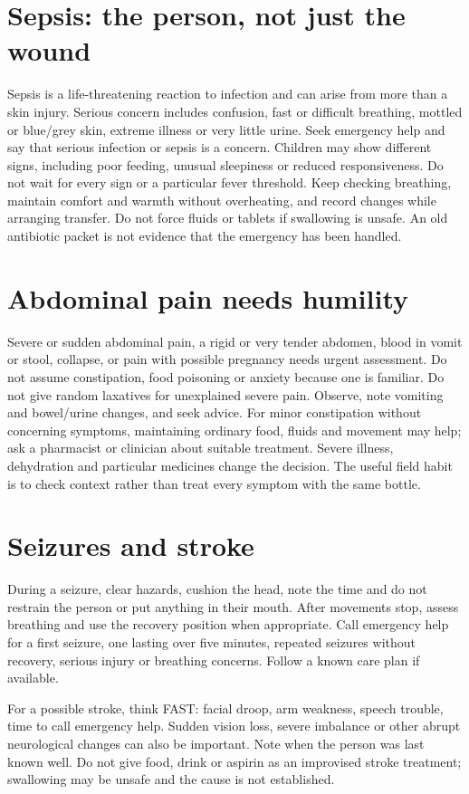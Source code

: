 \documentclass[10pt,openright]{book}
\begin{document}
\section*{Sepsis: the person, not just the wound}
Sepsis is a life-threatening reaction to infection and can arise from more than a skin injury. Serious concern includes confusion, fast or difficult breathing, mottled or blue/grey skin, extreme illness or very little urine. Seek emergency help and say that serious infection or sepsis is a concern. Children may show different signs, including poor feeding, unusual sleepiness or reduced responsiveness. Do not wait for every sign or a particular fever threshold. Keep checking breathing, maintain comfort and warmth without overheating, and record changes while arranging transfer. Do not force fluids or tablets if swallowing is unsafe. An old antibiotic packet is not evidence that the emergency has been handled.

\section*{Abdominal pain needs humility}
Severe or sudden abdominal pain, a rigid or very tender abdomen, blood in vomit or stool, collapse, or pain with possible pregnancy needs urgent assessment. Do not assume constipation, food poisoning or anxiety because one is familiar. Do not give random laxatives for unexplained severe pain. Observe, note vomiting and bowel/urine changes, and seek advice. For minor constipation without concerning symptoms, maintaining ordinary food, fluids and movement may help; ask a pharmacist or clinician about suitable treatment. Severe illness, dehydration and particular medicines change the decision. The useful field habit is to check context rather than treat every symptom with the same bottle.

\section*{Seizures and stroke}
During a seizure, clear hazards, cushion the head, note the time and do not restrain the person or put anything in their mouth. After movements stop, assess breathing and use the recovery position when appropriate. Call emergency help for a first seizure, one lasting over five minutes, repeated seizures without recovery, serious injury or breathing concerns. Follow a known care plan if available.

For a possible stroke, think FAST: facial droop, arm weakness, speech trouble, time to call emergency help. Sudden vision loss, severe imbalance or other abrupt neurological changes can also be important. Note when the person was last known well. Do not give food, drink or aspirin as an improvised stroke treatment; swallowing may be unsafe and the cause is not established.
\end{document}
